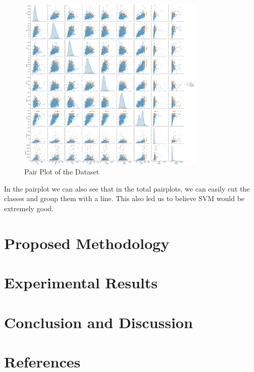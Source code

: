 \documentclass[11pt, letterpaper]{report}
\begin{document}
    \begin{figure}[H]
        \centering
        \includegraphics[width=0.8\textwidth]{pairplot.png} %
        \caption{Pair Plot of the Dataset}
        \label{fig:dataset-pairplot}
    \end{figure}
In the pairplot we can also see that in the total pairplots, we can easily cut the classes and group them with a line. This also led us to believe SVM would be extremely good. 

    \chapter{Proposed Methodology}
    \chapter{Experimental Results}
    \chapter{Conclusion and Discussion}
    \chapter{References}
\end{document}
